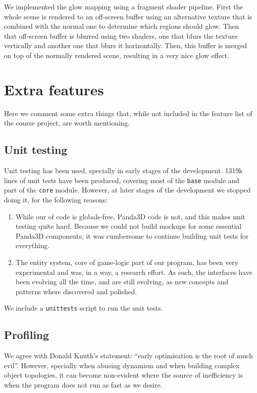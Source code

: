 \documentclass[a4paper,10pt]{article}
\begin{document}
We implemented the glow mapping using a fragment shader
pipeline. First the whole scene is rendered to an off-screen buffer
using an alternative texture that is combined with the normal one to
determine which regions should glow. Then that off-screen buffer is
blurred using two shaders, one that blurs the texture vertically and
another one that blurs it horizontally. Then, this buffer is merged on
top of the normally rendered scene, resulting in a very nice glow
effect.


\section{Extra features}

Here we comment some extra things that, while not included in the
feature list of the course project, are worth mentioning.

\subsection{Unit testing}

Unit testing has been used, specially in early stages of the
development. 1319k lines of unit tests have been produced, covering
most of the \texttt{base} module and part of the \texttt{core}
module. However, at later stages of the development we stopped doing
it, for the following reasons:

\begin{enumerate}
\item While our of code is globals-free, Panda3D code is not, and this
  makes unit testing quite hard. Because we could not build mockups
  for some essential Panda3D components, it was cumbersome to continue
  building unit tests for everything.

\item The entity system, core of game-logic part of our program, has
  been very experimental and was, in a way, a research effort. As
  such, the interfaces have been evolving all the time, and are still
  evolving, as new concepts and patterns where discovered and
  polished.
\end{enumerate}

We include a \texttt{unittests} script to run the unit tests.

\subsection{Profiling}

We agree  with Donald Knuth's  statement: ``early optimisation  is the
root of much evil''\cite{optimisation}. However, specially when
abusing dynamism and when building complex object topologies, it can
become non-evident where the source of inefficiency is when the
program does not run as fast as we desire.
\end{document}
